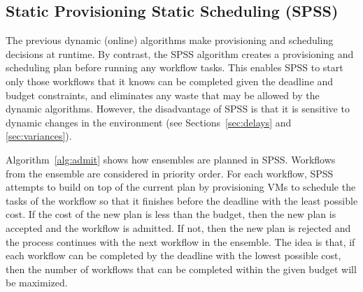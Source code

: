 \documentclass[conference]{IEEEtran}
\begin{document}
\subsection{Static Provisioning Static Scheduling (SPSS)}

The previous dynamic (online) algorithms make provisioning and scheduling
decisions at runtime. By contrast, the SPSS algorithm creates a provisioning
and scheduling plan before running any workflow tasks. This enables SPSS to
start only those workflows that it knows can be completed given the deadline and
budget constraints, and eliminates any waste that may be allowed by the dynamic
algorithms. However, the disadvantage of SPSS is that it is sensitive to dynamic
changes in the environment (see Sections~\ref{sec:delays} and
\ref{sec:variances}).






Algorithm~\ref{alg:admit} shows how ensembles are planned in SPSS. Workflows
from the ensemble are considered in priority order. For each workflow, SPSS
attempts to build on top of the current plan by provisioning VMs to schedule the
tasks of the workflow so that it finishes before the deadline with the least
possible cost. If the cost of the new plan is less than the budget, then the new
plan is accepted and the workflow is admitted. If not, then the new plan is
rejected and the process continues with the next workflow in the ensemble. The
idea is that, if each workflow can be completed by the
deadline with the lowest possible cost, then the number of workflows that can be
completed within the given budget will be maximized.
\end{document}
